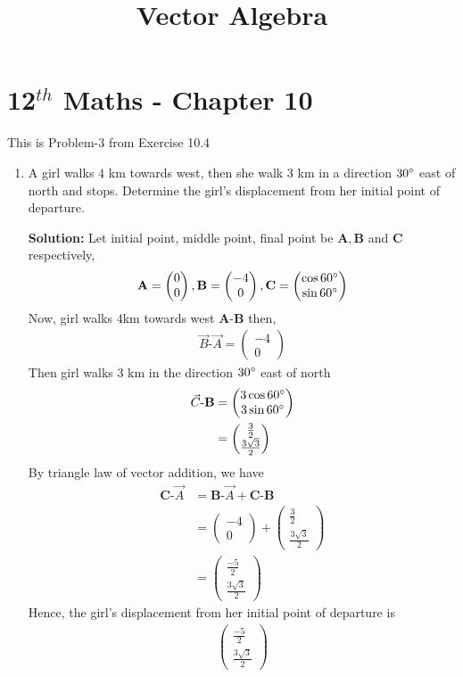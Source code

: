 \documentclass[12pt]{article}
\newcommand{\solution}{\noindent \textbf{Solution: }}
\newcommand{\myvec}[1]{\ensuremath{\begin{pmatrix}#1\end{pmatrix}}}
\let\vec\mathbf
\begin{document}
\begin{center}
\enlargethispage{-4cm}
\title{\textbf{Vector Algebra}}
\date{\vspace{-5ex}} %
\maketitle
\end{center}
\setcounter{page}{1}
\section*{12$^{th}$ Maths - Chapter 10}
This is Problem-3 from Exercise 10.4
\begin{enumerate}
\item A girl walks $4$ km towards west, then she walk $3$ km in a direction $30\degree$ east of north and stops. Determine the girl's displacement from her initial point of departure.

\solution 
		Let initial point, middle point, final point be $\vec{A}, \vec{B}$ and $\vec{C}$ respectively,  
\begin{align}
	\vec{A}=\myvec{0\\0}, \vec{B}=\myvec{-4\\0}, \vec{C}=\myvec{\cos{60\degree}\\\sin{60\degree}}
	\end{align}
Now, girl walks $4$km towards west $\vec{A}$-$\vec{B}$ then,
		\begin{align}
			\Vec{B}\text{-}\Vec{A}=\myvec{-4\\0}
\end{align}
Then girl walks 3 km in the direction $30\degree$ east of north
 \begin{align}
	 \Vec{C}\text{-}\vec{B}&=\myvec{3\cos{60\degree}\\3\sin{60\degree}}\\
&=\myvec{\frac{3}{2}\\ \frac{3\sqrt{3}}{2}}
 \end{align}
 By triangle law of vector addition, we have
\begin{align}
	\vec{C}\text{-}\Vec{A} &= \vec{B}\text{-}\Vec{A}+\vec{C}\text{-}\vec{B}\\
 &=\myvec{-4\\0}+\myvec{\frac{3}{2}\\[2pt] \frac{3\sqrt{3}}{2}}\\
 &=\myvec{\frac{-5}{2}\\[2pt] \frac{3\sqrt{3}}{2}}
\end{align}
  Hence, the girl's displacement from her initial point of departure is 
\begin{align}
\myvec{\frac{-5}{2}\\[2pt] \frac{3\sqrt{3}}{2}}
\end{align}


\end{enumerate}
\end{document}
